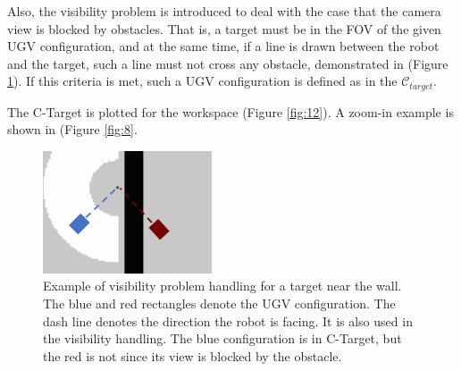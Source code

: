\documentclass[12pt,draftcls,onecolumn]{IEEEtran}
\begin{document}
Also, the visibility problem is introduced to deal with the case that the camera view is blocked by obstacles.
That is, a target must be in the FOV of the given UGV configuration, and at the same time, if a line is drawn between the robot and the target, such a line must not cross any obstacle, demonstrated in  (Figure \ref{fig:7}).
If this criteria is met, such a UGV configuration is defined as in the  $\mathcal{C}_{target}$.

The C-Target is plotted for the workspace (Figure \ref{fig:12}).
A zoom-in example is shown in (Figure \ref{fig:8}.





\begin{figure}
 \centering
  \includegraphics[width=5cm]{figures/visibility_eg}
  \caption{Example of visibility problem handling for a target near the wall. The blue and red rectangles denote the UGV configuration. The dash line denotes the direction the robot is facing. It is also used in the visibility handling. The blue configuration is in C-Target, but the red is not since its view is blocked by the obstacle.}
  \label{fig:7}
\end{figure}
\end{document}
